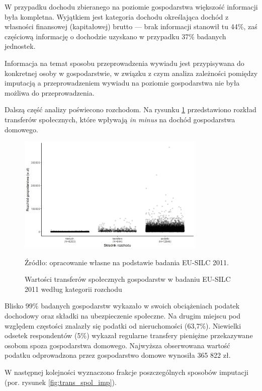 W przypadku dochodu zbieranego na poziomie gospodarstwa większość informacji była kompletna. Wyjątkiem jest kategoria dochodu określająca dochód z własności finansowej (kapitałowej) brutto --- brak informacji stanowił tu 44\%, zaś częściową informację o dochodzie uzyskano w przypadku 37\% badanych jednostek.

Informacja na temat sposobu przeprowadzenia wywiadu jest przypisywana do konkretnej osoby w gospodarstwie, w związku z czym analiza zależności pomiędzy imputacją a przeprowadzeniem wywiadu na poziomie gospodarstwa nie była możliwa do przeprowadzenia.

Dalszą część analizy poświecono rozchodom. Na rysunku \ref{fig:trans_spol} przedstawiono rozkład transferów społecznych, które wpływają \emph{in minus} na dochód gospodarstwa domowego.

\begin{figure}[htp]
\centering
\includegraphics[width=0.8\textwidth]{04_wykresy/transfery_spoleczne-1.png}
\caption{Wartości transferów społecznych gospodarstw w badaniu EU-SILC 2011 według kategorii rozchodu}
\small{Źródło: opracowanie własne na podstawie badania EU-SILC 2011.}
\label{fig:trans_spol}
\end{figure}

Blisko 99\% badanych gospodarstw wykazało w swoich obciążeniach podatek dochodowy oraz składki na ubezpieczenie społeczne. Na drugim miejscu pod względem częstości znalazły się podatki od nieruchomości (63,7\%). Niewielki odsetek respondentów (5\%) wykazał regularne transfery pieniężne przekazywane osobom spoza gospodarstwa domowego. Najwyższa obserwowana wartość podatku odprowadzona przez gospodarstwo domowe wynosiła 365 822 zł.

W następnej kolejności wyznaczono frakcje poszczególnych sposobów imputacji (por. rysunek \ref{fig:trans_spol_imp}).

